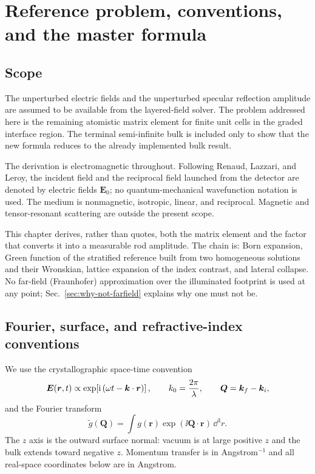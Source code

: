 \chapter{Reference problem, conventions, and the master formula}
\label{chap:reference}

\section{Scope}

The unperturbed electric fields and the unperturbed specular reflection
amplitude are assumed to be available from the layered-field solver.  The
problem addressed here is the remaining atomistic matrix element for finite
unit cells in the graded interface region.  The terminal semi-infinite bulk is
included only to show that the new formula reduces to the already implemented
bulk result.

The derivation is electromagnetic throughout.  Following Renaud, Lazzari, and
Leroy, the incident field and the reciprocal field launched from the detector
are denoted by electric fields $\bm E_0$; no quantum-mechanical wavefunction
notation is used.  The medium is nonmagnetic, isotropic, linear, and reciprocal.
Magnetic and tensor-resonant scattering are outside the present scope.

This chapter derives, rather than quotes, both the matrix element and the
factor that converts it into a measurable rod amplitude.  The chain is: Born
expansion, Green function of the stratified reference built from two
homogeneous solutions and their Wronskian, lattice expansion of the index
contrast, and lateral collapse.  No far-field (Fraunhofer) approximation over
the illuminated footprint is used at any point; Sec.~\ref{sec:why-not-farfield}
explains why one must not be.

\section{Fourier, surface, and refractive-index conventions}

We use the crystallographic space-time convention
\begin{equation}
  \bm E(\bm r,t)\propto
  \exp\!\left[\mathrm{i}\left(\omega t-\bm k\mathbin{\cdot}\bm r\right)\right],
  \qquad
  k_0=\frac{2\pi}{\lambda},
  \qquad
  \bm Q=\bm k_f-\bm k_i,
  \label{eq:convention}
\end{equation}
and the Fourier transform
\begin{equation}
  \widetilde g(\bm Q)
  =\int g(\bm r)\exp(\ii\bm Q\mathbin{\cdot}\bm r)\,\dd^3r.
  \label{eq:fourier}
\end{equation}
The $z$ axis is the outward surface normal: vacuum is at large positive $z$
and the bulk extends toward negative $z$.  Momentum transfer is in
Angstrom$^{-1}$ and all real-space coordinates below are in Angstrom.

